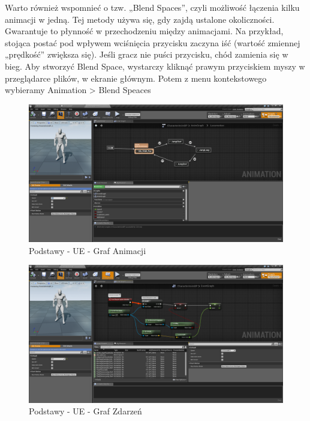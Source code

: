 \documentclass[brudnopis]{xmgr}
\begin{document}
Warto również wspomnieć o tzw. „Blend Spaces”, czyli możliwość łączenia kilku animacji w jedną. Tej metody używa się, gdy zajdą ustalone okoliczności. Gwarantuje to płynność w przechodzeniu między animacjami. Na przykład, stojąca postać pod wpływem wciśnięcia przycisku zaczyna iść (wartość zmiennej „prędkość” zwiększa się). Jeśli gracz nie puści przycisku, chód zamienia się w bieg.
Aby stworzyć Blend Space, wystarczy kliknąć prawym przyciskiem myszy w przeglądarce plików, w ekranie głównym. Potem z menu kontekstowego wybieramy Animation > Blend Speaces


\begin{figure}[!htb]
    \begin{center}
    \includegraphics[scale=0.25]{Screeny/AnimGraph_Event}
    \end{center}
    \caption{Podstawy - UE - Graf Animacji}
\end{figure}

\begin{figure}[!htb]
    \begin{center}
    \includegraphics[scale=0.25]{Screeny/EventGraph_Event}
    \end{center}
    \caption{Podstawy - UE - Graf Zdarzeń}
\end{figure}
\end{document}
